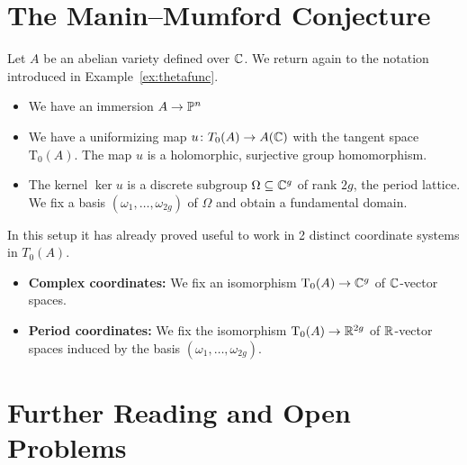 \section{The Manin--Mumford Conjecture}

Let $A$ be an abelian variety defined over ${\mathbb{C}}$. We return again to
the notation introduced in Example~\ref{ex:thetafunc}.
\begin{itemize}
\item We have an immersion $A\rightarrow{\mathbb{P}}^n$
\item We have a uniformizing map $u\colon T_0(A)\rightarrow
  A({\mathbb{C}})$  with the tangent space
  $\mathrm{T}_0(A)$. The map $u$ is a holomorphic, surjective group
  homomorphism.
\item The kernel $\ker u$ is a discrete subgroup $\Omega\subseteq{\mathbb{C}}^g$
  of rank $2g$, the period lattice. We fix a basis $(\omega_1,\ldots,\omega_{2g})$ of
  $\Omega$ and obtain a fundamental domain.
\end{itemize}

In this setup it has already proved useful to work in 2 distinct
coordinate systems in $T_0(A)$.

\begin{itemize}
\item \textbf{Complex coordinates:} We fix an isomorphism
  $\mathrm{T}_0(A)\rightarrow{\mathbb{C}}^g$ of ${\mathbb{C}}$-vector spaces. 
\item \textbf{Period coordinates:} We fix the isomorphism
  $\mathrm{T}_0(A)\rightarrow {\mathbb{R}}^{2g}$ of ${\mathbb{R}}$-vector spaces
  induced by the basis $(\omega_1,\ldots,\omega_{2g})$. 
\end{itemize}
\section{Further Reading and Open Problems}



